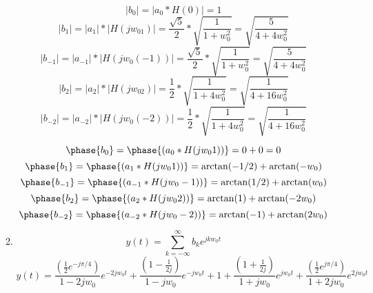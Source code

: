 \documentclass[10pt,a4paper, margin=1in]{article}
\begin{document}
\begin{enumerate}
\begin{enumerate}
 \begin{equation}
     |b_0| = |a_0*H(0)| = 1 
 \end{equation}
 \begin{equation}
      |b_1| = |a_1|*|H(jw_01)| = \frac{\sqrt{5}}{2} * \sqrt{\frac{1}{1+w_0^2}} = \sqrt{\frac{5}{4+4w_0^2}}
 \end{equation}
 \begin{equation}
     |b_{-1}| = |a_{-1}|*|H(jw_0(-1))| = \frac{\sqrt{5}}{2} * \sqrt{\frac{1}{1+w_0^2}} = \sqrt{\frac{5}{4+4w_0^2}}
 \end{equation}
\begin{equation}
    |b_2| = |a_2|*|H(jw_02)| = \frac{1}{2} * \sqrt{\frac{1}{1+4w_0^2}} = \sqrt{\frac{1}{4+16w_0^2}}
\end{equation}
\begin{equation}
    |b_{-2}| = |a_{-2}|*|H(jw_0(-2))| = \frac{1}{2} * \sqrt{\frac{1}{1+4w_0^2}} = \sqrt{\frac{1}{4+16w_0^2}}
\end{equation}

\begin{equation}
    \phase{ b_0} = \phase{(a_0 * H(jw_01))} =  0 + 0 = 0
\end{equation}
\begin{equation}
    \phase{ b_{1}} = \phase{ (a_1 * H(jw_01))} =  \arctan(-1/2) + \arctan(-w_0)
\end{equation}
\begin{equation}
    \phase{ b_{-1}} = \phase{ (a_{-1} * H(jw_0-1))} = \arctan(1/2) + \arctan(w_0)
\end{equation}
\begin{equation}
    \phase{ b_{2}} = \phase{ (a_{2} * H(jw_02))} = \arctan(1) + \arctan(-2w_0)
\end{equation}
\begin{equation}
    \phase{ b_{-2}} = \phase{ (a_{-2}* H(jw_0-2))} = \arctan(-1) + \arctan(2w_0)
\end{equation}
 
    \item %
    \begin{equation}
        y(t) = \sum_{k = -\infty}^{\infty} b_ke^{jkw_0t}
    \end{equation}
    \begin{equation}
        y(t) = \frac{(\frac{1}{2}e^{-j\pi/4})}{1-2jw_0}e^{-2jw_0t} + \frac{(1-\frac{1}{2j})}{1-jw_0}e^{-jw_0t} + 1 + \frac{(1+\frac{1}{2j})}{1+jw_0}e^{jw_0t} + \frac{(\frac{1}{2}e^{j\pi/4})}{1+2jw_0}e^{2jw_0t}
    \end{equation}
    \end{enumerate}


\end{enumerate}
\end{document}
